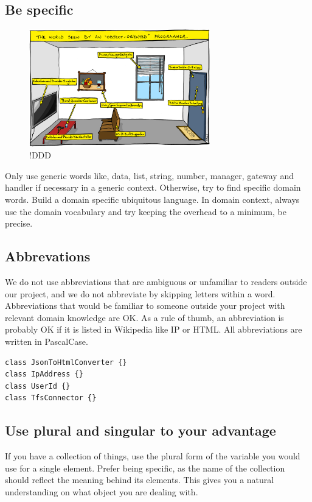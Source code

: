 \documentclass[11pt,a4paper]{article}
\begin{document}
\subsection{Be specific}

 
\begin{figure}[ht]
  \centering
  \includegraphics[width=0.7\textwidth]{oop-naming.png}
  \caption{!DDD}
\end{figure}

Only use generic words like, data, list, string, number, manager, gateway and handler if necessary in a generic context. Otherwise, try to find specific domain words. Build a domain specific ubiquitous language.
In domain context, always use the domain vocabulary and try keeping the overhead to a minimum, be precise.

\subsection{Abbrevations}
We do not use abbreviations that are ambiguous or unfamiliar to readers outside our project, and we do not abbreviate by skipping letters within a word. Abbreviations that would be familiar to someone outside your project with relevant domain knowledge are OK. As a rule of thumb, an abbreviation is probably OK if it is listed in Wikipedia like IP or HTML.
All abbreviations are written in PascalCase.

\begin{lstlisting}[language={[Sharp]C}, caption={Abbrevation Examples}]
class JsonToHtmlConverter {}
class IpAddress {}
class UserId {}
class TfsConnector {}
\end{lstlisting}

\filbreak

\subsection{Use plural and singular to your advantage}
If you have a collection of things, use the plural form of the variable you would use for a single element. Prefer being specific, as the name of the collection should reflect the meaning behind its elements. This gives you a natural understanding on what object you are dealing with.
\end{document}
